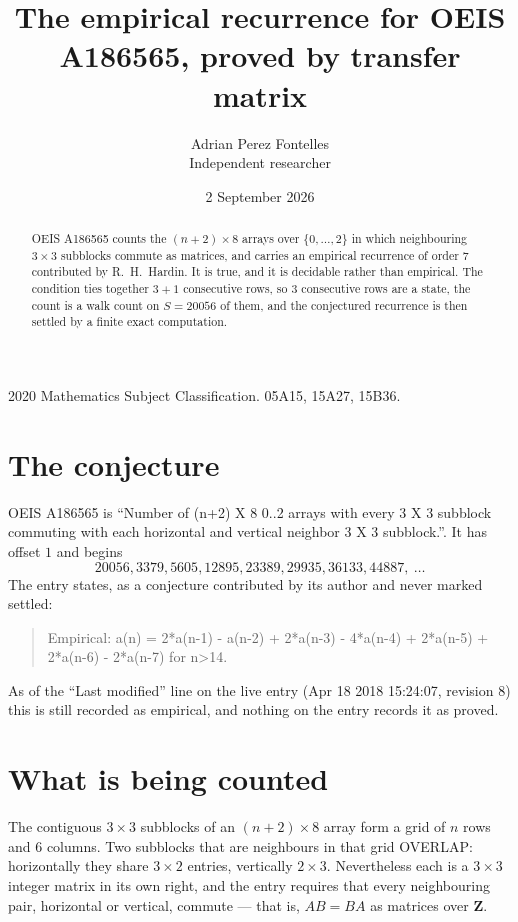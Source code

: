 \documentclass[11pt,a4paper]{article}
\title{The empirical recurrence for OEIS A186565, proved by transfer matrix}
\author{Adrian Perez Fontelles\\ \small Independent researcher}
\date{2 September 2026}
\theoremstyle{plain}
\theoremstyle{definition}
\begin{document}
\maketitle

\begin{abstract}
OEIS A186565 counts the $(n+2)\times8$ arrays over $\{0,\dots,2\}$ in which
neighbouring $3\times3$ subblocks commute as matrices, and carries an empirical
recurrence
of order $7$ contributed by R.~H.~Hardin. It is true, and it is decidable rather than
empirical. The condition ties together $3+1$ consecutive rows, so $3$ consecutive rows are
a state, the count is a walk count on $S=20056$ of them, and the conjectured recurrence is then
settled by a finite exact computation.
\end{abstract}

\noindent\small 2020 Mathematics Subject Classification. 05A15, 15A27, 15B36.\normalsize

\section{The conjecture}

OEIS A186565 is ``Number of (n+2) X 8 0..2 arrays with every 3 X 3 subblock commuting with each horizontal and vertical neighbor 3 X 3 subblock.''. It has offset $1$ and begins
\[
20056, 3379, 5605, 12895, 23389, 29935, 36133, 44887,\ \dots
\]
The entry states, as a conjecture contributed by its author and never marked settled:
\begin{quote}
Empirical: a(n) = 2*a(n-1) - a(n-2) + 2*a(n-3) - 4*a(n-4) + 2*a(n-5) + 2*a(n-6) - 2*a(n-7) for n>14.
\end{quote}
As of the ``Last modified'' line on the live entry (Apr 18 2018 15:24:07, revision 8) this is still
recorded as empirical, and nothing on the entry records it as proved.

\section{What is being counted}

The contiguous $3\times3$ subblocks of an $(n+2)\times8$ array form a grid of $n$
rows and $6$ columns. Two subblocks that are neighbours in that
grid OVERLAP: horizontally they share $3\times2$ entries, vertically
$2\times3$. Nevertheless each is a $3\times3$ integer matrix in its own right, and
the entry requires that every neighbouring pair, horizontal or vertical, commute --- that is,
$AB=BA$ as matrices over $\mathbf{Z}$.
\end{document}
